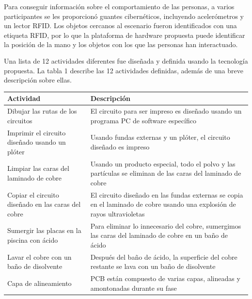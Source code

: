 \documentclass{article}
\begin{document}
Para conseguir información sobre el comportamiento de las personas, a varios participantes se les proporcionó guantes cibernéticos, incluyendo acelerómetros y un lector RFID. Los objetos cercanos al escenario fueron identificados con una etiqueta RFID, por lo que la plataforma de hardware propuesta puede identificar la posición de la mano y los objetos con los que las personas han interactuado.

Una lista de 12 actividades diferentes fue diseñada y definida usando la tecnología propuesta. La tabla 1 describe las 12 actividades definidas, además de una breve descripción sobre ellas. 

\begin{table}[h]
	\begin{center}
		\begin{tabular}{ | p{4cm} | p{9cm} | }
			\hline Actividad                                   & Descripción                                                                                                              \\ \hline
			Dibujar las rutas de los circuitos                 & El circuito para ser impreso es diseñado usando un programa PC de software específico                                    \\ \hline
			Imprimir el circuito diseñado usando un plóter     & Usando fundas externas y un plóter, el circuito diseñado es impreso                                                      \\ \hline
			Limpiar las caras del laminado de cobre            & Usando un producto especial, todo el polvo y las partículas se eliminan de las caras del laminado de cobre               \\ \hline
			Copiar el circuito diseñado en las caras del cobre & El circuito diseñado en las fundas externas se copia en el laminado de cobre usando una explosión de rayos ultravioletas \\ \hline
			Sumergir las placas en la piscina con ácido        & Para eliminar lo innecesario del cobre, sumergimos las caras del laminado de cobre en un baño de ácido                   \\ \hline
			Lavar el cobre con un baño de disolvente           & Después del baño de ácido, la superficie del cobre restante se lava con un baño de disolvente                            \\ \hline
			Capa de alineamiento                               & PCB están compuesto de varias capas, alineadas y amontonadas durante su fase                                             \\ \hline

\end{tabular}
\end{center}
\end{table}
\end{document}
